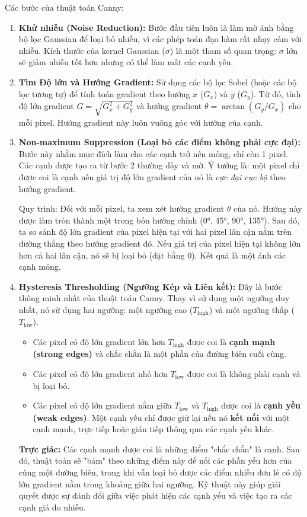Các bước của thuật toán Canny:
\begin{enumerate}
    \item \textbf{Khử nhiễu (Noise Reduction):} Bước đầu tiên luôn là làm mờ ảnh bằng bộ lọc Gaussian để loại bỏ nhiễu, vì các phép toán đạo hàm rất nhạy cảm với nhiễu. Kích thước của kernel Gaussian ($\sigma$) là một tham số quan trọng: $\sigma$ lớn sẽ giảm nhiễu tốt hơn nhưng có thể làm mất các cạnh yếu.
    
    \item \textbf{Tìm Độ lớn và Hướng Gradient:} Sử dụng các bộ lọc Sobel (hoặc các bộ lọc tương tự) để tính toán gradient theo hướng $x$ ($G_x$) và $y$ ($G_y$). Từ đó, tính độ lớn gradient $G = \sqrt{G_x^2 + G_y^2}$ và hướng gradient $\theta = \arctan(G_y / G_x)$ cho mỗi pixel. Hướng gradient này luôn vuông góc với hướng của cạnh.
    
    \item \textbf{Non-maximum Suppression (Loại bỏ các điểm không phải cực đại):} Bước này nhằm mục đích làm cho các cạnh trở nên mỏng, chỉ còn 1 pixel. Các cạnh được tạo ra từ bước 2 thường dày và mờ. Ý tưởng là: một pixel chỉ được coi là cạnh nếu giá trị độ lớn gradient của nó là \textit{cực đại cục bộ} theo hướng gradient.
    
    Quy trình: Đối với mỗi pixel, ta xem xét hướng gradient $\theta$ của nó. Hướng này được làm tròn thành một trong bốn hướng chính (0°, 45°, 90°, 135°). Sau đó, ta so sánh độ lớn gradient của pixel hiện tại với hai pixel lân cận nằm trên đường thẳng theo hướng gradient đó. Nếu giá trị của pixel hiện tại không lớn hơn cả hai lân cận, nó sẽ bị loại bỏ (đặt bằng 0). Kết quả là một ảnh các cạnh mỏng.
    
    \item \textbf{Hysteresis Thresholding (Ngưỡng Kép và Liên kết):} Đây là bước thông minh nhất của thuật toán Canny. Thay vì sử dụng một ngưỡng duy nhất, nó sử dụng hai ngưỡng: một ngưỡng cao ($T_{\text{high}}$) và một ngưỡng thấp ($T_{\text{low}}$).
    \begin{itemize}
        \item Các pixel có độ lớn gradient lớn hơn $T_{\text{high}}$ được coi là \textbf{cạnh mạnh (strong edges)} và chắc chắn là một phần của đường biên cuối cùng.
        \item Các pixel có độ lớn gradient nhỏ hơn $T_{\text{low}}$ được coi là không phải cạnh và bị loại bỏ.
        \item Các pixel có độ lớn gradient nằm giữa $T_{\text{low}}$ và $T_{\text{high}}$ được coi là \textbf{cạnh yếu (weak edges)}. Một cạnh yếu chỉ được giữ lại nếu nó \textbf{kết nối} với một cạnh mạnh, trực tiếp hoặc gián tiếp thông qua các cạnh yếu khác.
    \end{itemize}
    \textbf{Trực giác:} Các cạnh mạnh được coi là những điểm "chắc chắn" là cạnh. Sau đó, thuật toán sẽ "bám" theo những điểm này để nối các phần yếu hơn của cùng một đường biên, trong khi vẫn loại bỏ được các điểm nhiễu đơn lẻ có độ lớn gradient nằm trong khoảng giữa hai ngưỡng. Kỹ thuật này giúp giải quyết được sự đánh đổi giữa việc phát hiện các cạnh yếu và việc tạo ra các cạnh giả do nhiễu.
\end{enumerate}

